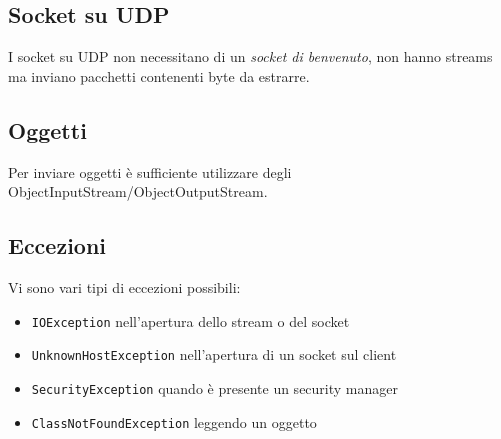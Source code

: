 \documentclass[11pt]{article}
\newcommand{\code}[1]{\texttt{#1}}
\begin{document}
\subsection{Socket su UDP}
I socket su UDP non necessitano di un \textit{socket di benvenuto}, non hanno streams ma inviano pacchetti contenenti byte da estrarre. 
\subsection{Oggetti}
Per inviare oggetti è sufficiente utilizzare degli ObjectInputStream/ObjectOutputStream. 
\subsection{Eccezioni}
Vi sono vari tipi di eccezioni possibili:
\begin{itemize}
    \item \code{IOException} nell'apertura dello stream o del socket 
    \item \code{UnknownHostException} nell'apertura di un socket sul client 
    \item \code{SecurityException} quando è presente un security manager
    \item \code{ClassNotFoundException} leggendo un oggetto
\end{itemize}


\printglossary
\end{document}
